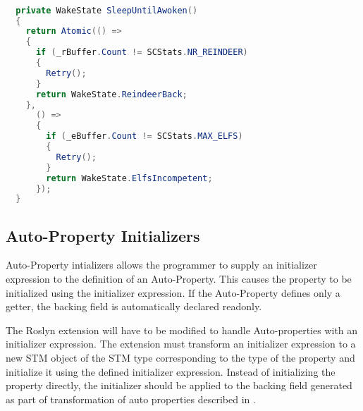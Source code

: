 \begin{lstlisting}[float,label=lst:static_using_example,
  caption={\ac{STM} library with static using statement},
  language=Java,  
  showspaces=false,
  showtabs=false,
  breaklines=true,
  showstringspaces=false,
  breakatwhitespace=true,
  escapechar=~,
  commentstyle=\color{greencomments},
  keywordstyle=\color{bluekeywords},
  stringstyle=\color{redstrings},
  morekeywords={atomic, retry, orelse, var, get, set, ref, out}]  % Start your code-block

  private WakeState SleepUntilAwoken()
  {
    return Atomic(() =>
    {
      if (_rBuffer.Count != SCStats.NR_REINDEER)
      {
        Retry();
      }
      return WakeState.ReindeerBack;
    },
      () =>
      {
        if (_eBuffer.Count != SCStats.MAX_ELFS)
        {
          Retry();
        }
        return WakeState.ElfsIncompetent;
      });
  }
\end{lstlisting}

\subsection{Auto-Property Initializers}
Auto-Property intializers allows the programmer to supply an initializer expression to the definition of an Auto-Property\cite{csharp6one}\cite{csharp6two}\cite{csharp6featureDescription}. This causes the property  to be initialized using the initializer expression. If the Auto-Property defines only a getter, the backing field is automatically declared readonly\cite{csharp6one}\cite{csharp6featureDescription}. 

The Roslyn extension will have to be modified to handle  Auto-properties with an initializer expression. The extension must transform an initializer expression to a new \ac{STM} object of the \ac{STM} type corresponding to the type of the  property and initialize it using the defined initializer expression. Instead of initializing the property directly, the initializer should be applied to the backing field generated as part of transformation of  auto properties described in .

\worksheetend

